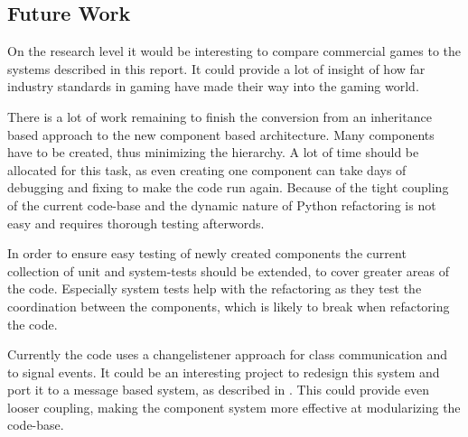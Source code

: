 \subsection{Future Work}
On the research level it would be interesting to compare commercial games to the \OS{} systems described in this
report. It could provide a lot of insight of how far industry standards in gaming have made their way into the \OS{}
gaming world.

There is a lot of work remaining to finish the conversion from an inheritance based approach to the new component based
architecture. Many components have to be created, thus minimizing the hierarchy. A lot of time should be allocated for
this task, as even creating one component can take days of debugging and fixing to make the code run again. Because of
the tight coupling of the current code-base and the dynamic nature of Python refactoring is not easy and requires
thorough testing afterwords.

In order to ensure easy testing of newly created components the current collection of unit and system-tests should be
extended, to cover greater areas of the code. Especially system tests help with the refactoring as they test the
coordination between the components, which is likely to break when refactoring the code.

Currently the code uses a changelistener approach for class communication and to signal events. It could be an
interesting project to redesign this system and port it to a message based system, as described in \cite{Fh02ageneric}.
This could provide even looser coupling, making the component system more effective at modularizing the code-base.

\pagebreak
